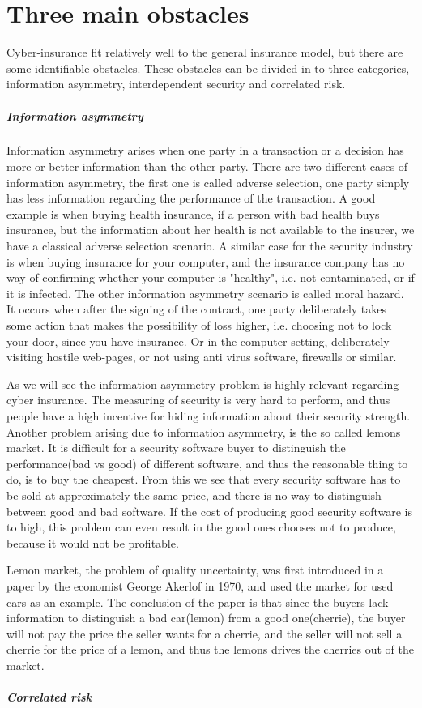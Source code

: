 \section{Three main obstacles}
Cyber-insurance fit relatively well to the general insurance model, but there are some identifiable obstacles. These obstacles can be divided in to three categories, information asymmetry, interdependent security and  correlated risk. 
\subparagraph{Information asymmetry}
Information asymmetry arises when one party in a transaction or a decision has more or better
 information than the other party. There are two different cases of information asymmetry, the first
  one is called adverse selection, one party simply has less information regarding the performance of
   the transaction. A good example is when buying health insurance, if a person with bad health buys
    insurance, but the information about her health is not available to the insurer, we have a
     classical adverse selection scenario. A similar case for the security industry is when buying
      insurance for your computer, and the insurance company has no way of confirming whether your
       computer is "healthy", i.e. not contaminated, or if it is infected. 
The other information asymmetry scenario is called moral hazard. It occurs when after the signing of
 the contract, one party deliberately takes some action that makes the possibility of loss higher,
  i.e. choosing not to lock your door, since you have insurance. Or in the computer setting,
   deliberately visiting hostile web-pages, or not using anti virus software, firewalls or similar.
    \cite{solutiontoinfoasym}
    
As we will see the information asymmetry problem is highly relevant regarding cyber insurance.
 The measuring of security is very hard to perform, and thus people have a 
 high incentive for hiding information about their security strength. 
 Another problem arising due to information asymmetry, 
 is the so called lemons market. It is difficult for a security software buyer to distinguish the
  performance(bad vs good) of different software, and thus the reasonable thing to do, is to buy the
   cheapest. From this we see that every security software has to be sold at approximately the same
    price, and there is no way to distinguish between good and bad software. If the cost of producing
     good security software is to high, this problem can even result in the good ones chooses not to
      produce, because it would not be profitable. 
      
      Lemon market, the problem of quality uncertainty, was first introduced in a paper \cite{lemonpaper} by the economist George Akerlof in 1970,
       and used the market for used cars as an example.\cite{lemon} The conclusion of the paper is
        that since the buyers lack information to distinguish a bad car(lemon) from a good
         one(cherrie), the buyer will not pay the price the seller wants for a cherrie, 
         and the seller will not sell a cherrie for the price of a lemon, 
         and thus the lemons drives the cherries out of the market. 
\subparagraph{Correlated risk}

